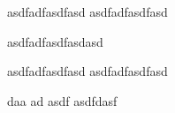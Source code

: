 asdfadfasdfasd
asdfadfasdfasd

asdfadfasdfasdasd


asdfadfasdfasd
asdfadfasdfasd

daa 
ad 
asdf 
 asdfdasf 
 